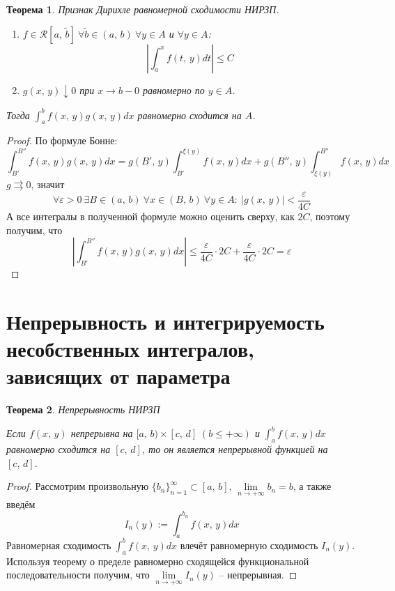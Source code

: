 \documentclass[a4paper,12pt]{article}
\renewcommand{\leq}{\ensuremath{\leqslant}}
\theoremstyle{plain}
\newtheorem{theorem}{Теорема}[section]
\theoremstyle{definition}
\theoremstyle{remark}
\begin{document}
\begin{theorem}
	Признак Дирихле равномерной сходимости НИРЗП.

	\begin{enumerate}
		\item $f \in \mathcal{R}[a,\,\tilde{b}]\:\forall \tilde{b} \in (a,\,b) \: \forall y \in A$ и $\forall y \in A$:
		      \[\left|\int_a^x f(t,\,y)dt\right| \leq C\]
		\item $g(x,\,y) \downarrow 0$ при $x \to b - 0$ равномерно по $y \in A$.
	\end{enumerate}
	Тогда $\int_a^b f(x,\,y)g(x,\,y)dx$ равномерно сходится на $A$.
\end{theorem}
\begin{proof}
	По формуле Бонне:
	\[\int_{B'}^{B''}f(x,\,y)g(x,\,y)dx = g(B',\,y)\int_{B'}^{\xi(y)}f(x,\,y)dx + g(B'',\,y)\int_{\xi(y)}^{B''}f(x,\,y)dx\]
	$g \rightrightarrows 0$, значит
	\[\forall \varepsilon > 0 \: \exists B \in (a,\,b) \: \forall x \in (B,\,b) \: \forall y \in A :\: |g(x,\,y)| < \frac{\varepsilon}{4C}\]
	А все интегралы в полученной формуле можно оценить сверху, как $2C$, поэтому получим, что
	\[\left|\int_{B'}^{B''}f(x,\,y)g(x,\,y)dx\right| \leq \frac{\varepsilon}{4C}\cdot 2C + \frac{\varepsilon}{4C}\cdot 2C = \varepsilon\]
\end{proof}

\section{Непрерывность и интегрируемость несобственных интегралов, зависящих от параметра}
\begin{theorem}
	Непрерывность НИРЗП

	Если $f(x,\,y)$ непрерывна на $[a,\,b) \times [c,\,d]\; (b \leq +\infty)$ и $\int_a^bf(x,\,y)dx$ равномерно сходится на $[c,\,d]$, то он является непрерывной функцией на $[c,\,d]$.
\end{theorem}
\begin{proof}
	Рассмотрим произвольную $\{b_n\}_{n = 1}^\infty \subset [a,\,b],\,\lim\limits_{n \to +\infty}b_n = b$, а также введём
	\[I_n(y) := \int_a^{b_n}f(x,\,y)dx\]
	Равномерная сходимость $\int_a^bf(x,\,y)dx$ влечёт равномерную сходимость $I_n(y)$. Используя теорему о пределе равномерно сходящейся функциональной последовательности получим, что $\lim\limits_{n \to +\infty} I_n(y)$ -- непрерывная.
\end{proof}
\end{document}
